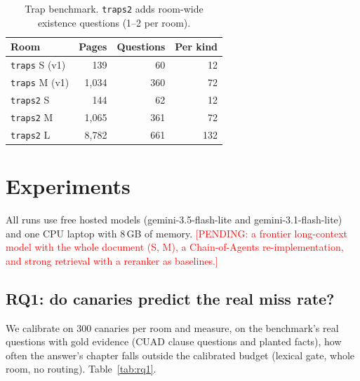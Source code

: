 \documentclass[11pt]{article}
\newcommand{\pending}[1]{\textcolor{red}{[PENDING: #1]}}   %
\begin{document}
\begin{table}[t]
\centering\small
\begin{tabular}{lrrr}
\toprule
Room & Pages & Questions & Per kind \\
\midrule
\texttt{traps} S (v1) & 139 & 60 & 12 \\
\texttt{traps} M (v1) & 1,034 & 360 & 72 \\
\texttt{traps2} S & 144 & 62 & 12 \\
\texttt{traps2} M & 1,065 & 361 & 72 \\
\texttt{traps2} L & 8,782 & 661 & 132 \\
\bottomrule
\end{tabular}
\caption{Trap benchmark. \texttt{traps2} adds room-wide existence questions (1--2 per room).}
\label{tab:bench}
\end{table}

\section{Experiments}
\label{sec:experiments}

All runs use free hosted models (gemini-3.5-flash-lite and gemini-3.1-flash-lite) and one CPU laptop with 8\,GB of memory. \pending{a frontier long-context model with the whole document (S, M), a Chain-of-Agents re-implementation, and strong retrieval with a reranker as baselines.}

\subsection{RQ1: do canaries predict the real miss rate?}
\label{sec:rq1}
We calibrate on 300 canaries per room and measure, on the benchmark's real questions with gold evidence (CUAD clause questions and planted facts), how often the answer's chapter falls outside the calibrated budget (lexical gate, whole room, no routing). Table~\ref{tab:rq1}.
\end{document}

